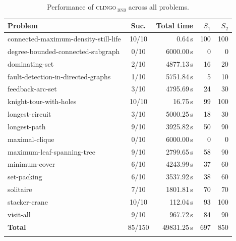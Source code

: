 \begin{table}[htbp]
\centering
\caption{Performance of \textsc{clingo\,\textsubscript{bnb}} across all problems.}
\label{tab:performance-clingo_bnb}
\begin{tabular}{lcrrr}
\toprule
Problem & Suc. & Total time & $S_1$ & $S_2$ \\
\midrule
connected-maximum-density-still-life & 10/10 & 0.64\,s & 100 & 100 \\
degree-bounded-connected-subgraph & 0/10 & 6000.00\,s & 0 & 0 \\
dominating-set & 2/10 & 4877.13\,s & 16 & 20 \\
fault-detection-in-directed-graphs & 1/10 & 5751.84\,s & 5 & 10 \\
feedback-arc-set & 3/10 & 4795.69\,s & 24 & 30 \\
knight-tour-with-holes & 10/10 & 16.75\,s & 99 & 100 \\
longest-circuit & 3/10 & 5000.25\,s & 18 & 30 \\
longest-path & 9/10 & 3925.82\,s & 50 & 90 \\
maximal-clique & 0/10 & 6000.00\,s & 0 & 0 \\
maximum-leaf-spanning-tree & 9/10 & 2799.65\,s & 58 & 90 \\
minimum-cover & 6/10 & 4243.99\,s & 37 & 60 \\
set-packing & 6/10 & 3537.92\,s & 38 & 60 \\
solitaire & 7/10 & 1801.81\,s & 70 & 70 \\
stacker-crane & 10/10 & 112.04\,s & 93 & 100 \\
visit-all & 9/10 & 967.72\,s & 84 & 90 \\
\midrule
\textbf{Total} & 85/150 & 49831.25\,s & 697 & 850 \\
\botrule
\end{tabular}
\end{table}

